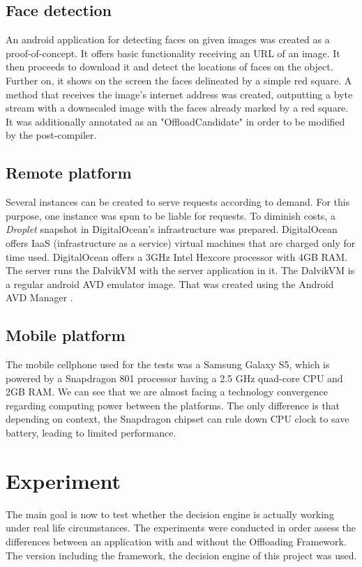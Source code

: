 \documentclass[10pt, conference, letterpaper]{IEEEtran}
\begin{document}
  \subsection{Face detection}
  An android application for detecting faces on given images was created as a proof-of-concept. It offers basic functionality receiving an URL of an image. It then proceeds to download it and detect the locations of faces on the object. Further on, it shows on the screen the faces delineated by a simple red square. A method that receives the image's internet address was created, outputting a byte stream with a downscaled image with the faces already marked by a red square. It was additionally annotated as an "OffloadCandidate" in order to be modified by the post-compiler.

  \subsection{Remote platform}
  Several instances can be created to serve requests according to demand. For this purpose, one instance was spun to be liable for requests. To diminish costs, a \textit{Droplet} snapshot in DigitalOcean's infrastructure \cite{digitalocean} was prepared. DigitalOcean offers IaaS (infrastructure as a service) virtual machines that are charged only for time used. DigitalOcean offers a 3GHz Intel Hexcore processor with 4GB RAM. The server runs the DalvikVM with the server application in it. The DalvikVM is a regular android AVD emulator image. That was created using the Android AVD Manager \cite{androidavd}.

  \subsection{Mobile platform}
  The mobile cellphone used for the tests was a Samsung Galaxy S5, which is powered by a Snapdragon 801 processor having a 2.5 GHz quad-core CPU and 2GB RAM. We can see that we are almost facing a technology convergence regarding computing power between the platforms. The only difference is that depending on context, the Snapdragon chipset can rule down CPU clock to save battery, leading to limited performance.

  \section{Experiment}
  The main goal is now to test whether the decision engine is actually working under real life circumstances. The experiments were conducted in order assess the differences between an application with and without the Offloading Framework. The version including the framework, the decision engine of this project was used.
\end{document}
